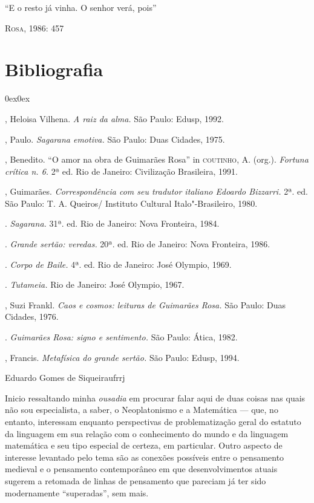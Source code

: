 {\epigraph{“E o resto já vinha. O senhor verá, pois”}
{\textsc{Rosa}, 1986: 457}

\section{Bibliografia}

\begin{description}0ex\parsep0ex
\newcommand{\tit}[1]{\item[\textnormal{\textsc{\MakeTextLowercase{#1}}}]}
\newcommand{\titidem}{\item[\line(1,0){25}]}
\tit{ARAUJO}, Heloisa Vilhena. \emph{A raiz da alma.} São Paulo: Edusp,
1992.

\tit{DANTAS}, Paulo. \emph{Sagarana emotiva.} São Paulo: Duas Cidades,
1975.

\tit{NUNES}, Benedito. “O amor na obra de Guimarães Rosa” in
\textsc{coutinho}, A.
(org.). \emph{Fortuna crítica n. 6.} 2ª ed. Rio de Janeiro:
Civilização Brasileira, 1991.

\tit{ROSA}, Guimarães. \emph{Correspondência com seu tradutor italiano
Edoardo Bizzarri.} 2ª. ed. São Paulo: T. A. Queiros/ Instituto
Cultural Italo"-Brasileiro, 1980.

\titidem. \emph{Sagarana.} 31ª. ed. Rio de Janeiro: Nova
Fronteira, 1984.

\titidem. \emph{Grande sertão: veredas.} 20ª. ed. Rio de
Janeiro: Nova Fronteira, 1986.

\titidem. \textit{Corpo de Baile.} 4ª. ed. Rio de Janeiro: José
Olympio, 1969.

\titidem. \textit{Tutameia.} Rio de Janeiro: José Olympio, 1967.

\tit{SPERBER}, Suzi Frankl. \emph{Caos e cosmos: leituras de Guimarães
Rosa.} São Paulo: Duas Cidades, 1976.

\titidem. \emph{Guimarães Rosa: signo e sentimento.} São Paulo:
Ática, 1982.

\tit{UTÉZA}, Francis. \emph{Metafísica do grande sertão.} São Paulo:
Edusp, 1994.
\end{description}


%
	{Eduardo Gomes de Siqueira}{ufrrj}



Inicio ressaltando minha \emph{ousadia} em procurar falar
aqui de duas coisas nas quais não sou especialista, a saber, o
Neoplatonismo e a Matemática --- que, no entanto, interessam
enquanto perspectivas de problematização geral do estatuto da
linguagem em sua relação com o conhecimento do mundo e da
linguagem matemática e seu tipo especial de certeza, em
particular. Outro aspecto de interesse levantado pelo tema são
as conexões possíveis entre o pensamento medieval e o pensamento
contemporâneo em que desenvolvimentos atuais sugerem a retomada
de linhas de pensamento que pareciam já ter sido modernamente
``superadas'', sem mais.

}
